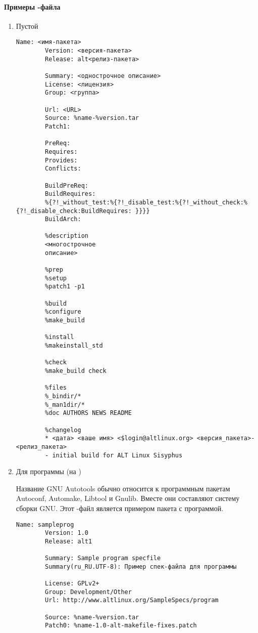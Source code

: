\paragraph{Примеры -файла}
\begin{enumerate}
	\item Пустой 
	\begin{Verbatim}[breaklines=true,breakanywhere=true,xleftmargin=-0.25\textwidth]
		Name: <имя-пакета>
		Version: <версия-пакета>
		Release: alt<релиз-пакета>
		
		Summary: <однострочное описание>
		License: <лицензия>
		Group: <группа>
		
		Url: <URL>
		Source: %name-%version.tar
		Patch1:
		
		PreReq:
		Requires:
		Provides:
		Conflicts:
		
		BuildPreReq:
		BuildRequires:
		%{?!_without_test:%{?!_disable_test:%{?!_without_check:%{?!_disable_check:BuildRequires: }}}}
		BuildArch:
		
		%description
		<многострочное
		описание>
		
		%prep
		%setup
		%patch1 -p1
		
		%build
		%configure
		%make_build
		
		%install
		%makeinstall_std
		
		%check
		%make_build check
		
		%files
		%_bindir/*
		%_man1dir/*
		%doc AUTHORS NEWS README
		
		%changelog
		* <дата> <ваше имя> <$login@altlinux.org> <версия_пакета>-<релиз_пакета>
		- initial build for ALT Linux Sisyphus
	\end{Verbatim}
	
	\item Для программы (на )
	
	Название GNU Autotools обычно относится к программным пакетам Autoconf, Automake, Libtool и Gnulib. Вместе они составляют систему сборки GNU. Этот -файл является примером пакета с программой.
	\begin{Verbatim}[breaklines=true,breakanywhere=true,xleftmargin=-0.25\textwidth]
		Name: sampleprog
		Version: 1.0
		Release: alt1
		
		Summary: Sample program specfile
		Summary(ru_RU.UTF-8): Пример спек-файла для программы
		
		License: GPLv2+
		Group: Development/Other
		Url: http://www.altlinux.org/SampleSpecs/program
		
		Source: %name-%version.tar
		Patch0: %name-1.0-alt-makefile-fixes.patch
		

\end{Verbatim}
\end{enumerate}
